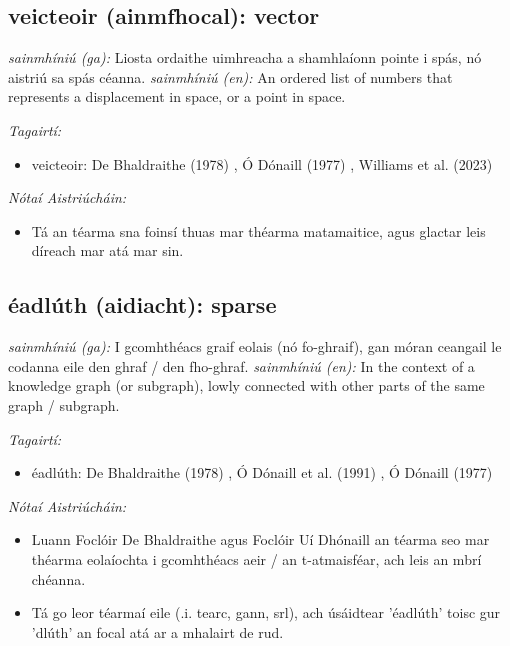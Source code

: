 \documentclass{article}
\begin{document}
\subsection*{veicteoir (ainmfhocal): vector} 
 \noindent \textit{sainmhíniú (ga):} Liosta ordaithe uimhreacha a shamhlaíonn pointe i spás, nó aistriú sa spás céanna.
\newline\newline
 \noindent \textit{sainmhíniú (en):} An ordered list of numbers that represents a displacement in space, or a point in space.
\newline

 \noindent \textit{Tagairtí:}
\begin{itemize}
	\item veicteoir: De Bhaldraithe (1978) \cite{de-bhaldraithe}, Ó Dónaill (1977) \cite{odonaill}, Williams et al. (2023) \cite{storchiste}
\end{itemize}

 \noindent \textit{Nótaí Aistriúcháin:}
\begin{itemize}
	\item Tá an téarma sna foinsí thuas mar théarma matamaitice, agus glactar leis díreach mar atá mar sin.
\end{itemize}


\subsection*{éadlúth (aidiacht): sparse} 
 \noindent \textit{sainmhíniú (ga):} I gcomhthéacs graif eolais (nó fo-ghraif), gan móran ceangail le codanna eile den ghraf / den fho-ghraf.
\newline\newline
 \noindent \textit{sainmhíniú (en):} In the context of a knowledge graph (or subgraph), lowly connected with other parts of the same graph / subgraph.
\newline

 \noindent \textit{Tagairtí:}
\begin{itemize}
	\item éadlúth: De Bhaldraithe (1978) \cite{de-bhaldraithe}, Ó Dónaill et al. (1991) \cite{focloir-beag}, Ó Dónaill (1977) \cite{odonaill}
\end{itemize}

 \noindent \textit{Nótaí Aistriúcháin:}
\begin{itemize}
	\item Luann Foclóir De Bhaldraithe agus Foclóir Uí Dhónaill an téarma seo mar théarma eolaíochta i gcomhthéacs aeir / an t-atmaisféar, ach leis an mbrí chéanna.
	\item Tá go leor téarmaí eile (.i. tearc, gann, srl), ach úsáidtear 'éadlúth' toisc gur 'dlúth' an focal atá ar a mhalairt de rud.
\end{itemize}
\end{document}
